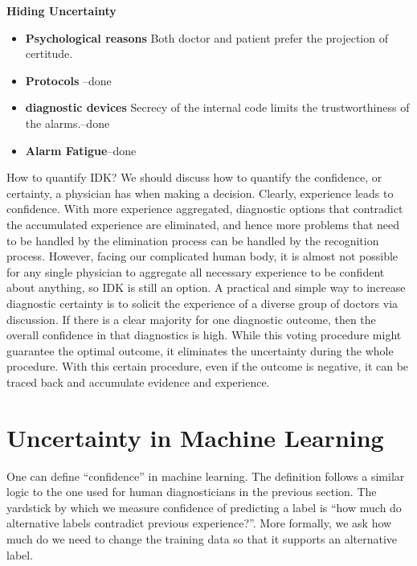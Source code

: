 \documentclass[11pt]{pnas-new}
\begin{document}
 {\bf Hiding Uncertainty}
  \begin{itemize}
    \item {\bf Psychological reasons} Both doctor and patient prefer
      the projection of certitude.
    \item {\bf Protocols} --done
    \item {\bf diagnostic devices} Secrecy of the internal code limits
      the trustworthiness of the alarms.--done
    \item{\bf Alarm Fatigue}--done
  \end{itemize}
\fi

How to quantify IDK? We should discuss how to quantify the confidence, or certainty, a physician has when making a decision. 
Clearly, experience leads to confidence. With more experience aggregated, diagnostic options that contradict the accumulated
  experience are eliminated, and hence more problems that need to be handled by the elimination process can be handled by the recognition process. However, facing our complicated human body, it is almost not possible for any single physician to aggregate all necessary experience to be confident about anything, so IDK is still an option. A practical and simple way to increase diagnostic certainty is to solicit the experience of a diverse group of doctors via discussion. If there is a clear majority for one diagnostic outcome,
      then the overall confidence in that diagnostics is high. While this voting procedure might guarantee the optimal outcome, it eliminates the uncertainty during the whole procedure. With this certain procedure, even if the outcome is negative, it can be traced back and accumulate evidence and experience. 

\section{Uncertainty in Machine Learning}

One can define ``confidence'' in machine learning. The definition follows a
similar logic to the one used for human diagnosticians in the previous
section. The yardstick by which we measure confidence of predicting a
label is ``how much do alternative labels contradict previous
experience?''.
More formally, we ask how much do we need to change the training data
so that it supports an alternative label.
\end{document}
